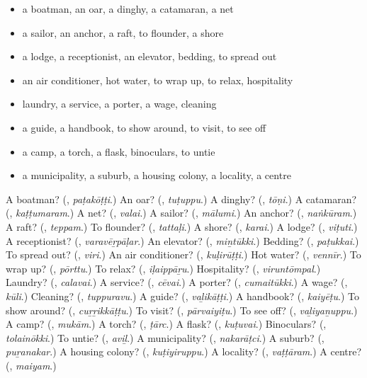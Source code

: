 \begin{itemize}
\raggedright
  \item a boatman, an oar, a dinghy, a catamaran, a net
  \item a sailor, an anchor, a raft, to flounder, a shore
  \item a lodge, a receptionist, an elevator, bedding, to spread out
  \item an air conditioner, hot water, to wrap up, to relax, hospitality
  \item laundry, a service, a porter, a wage, cleaning
  \item a guide, a handbook, to show around, to visit, to see off
  \item a camp, a torch, a flask, binoculars, to untie
  \item a municipality, a suburb, a housing colony, a locality, a centre
\end{itemize}

\begin{tcolorbox}[breakable,colback=teal!4,colframe=teal!35!black,title={Before you move on}]
A boatman? (\textbf{}, \emph{paṭakōṭṭi}.) An oar? (\textbf{}, \emph{tuṭuppu}.) A dinghy? (\textbf{}, \emph{tōṇi}.) A catamaran? (\textbf{}, \emph{kaṭṭumaram}.) A net? (\textbf{}, \emph{valai}.) A sailor? (\textbf{}, \emph{mālumi}.) An anchor? (\textbf{}, \emph{naṅkūram}.) A raft? (\textbf{}, \emph{teppam}.) To flounder? (\textbf{}, \emph{tattaḷi}.) A shore? (\textbf{}, \emph{karai}.) A lodge? (\textbf{}, \emph{viṭuti}.) A receptionist? (\textbf{}, \emph{varavēṟpāḷar}.) An elevator? (\textbf{}, \emph{miṉtūkki}.) Bedding? (\textbf{}, \emph{paṭukkai}.) To spread out? (\textbf{}, \emph{viri}.) An air conditioner? (\textbf{}, \emph{kuḷirūṭṭi}.) Hot water? (\textbf{}, \emph{vennīr}.) To wrap up? (\textbf{}, \emph{pōrttu}.) To relax? (\textbf{}, \emph{iḷaippāṟu}.) Hospitality? (\textbf{}, \emph{viruntōmpal}.) Laundry? (\textbf{}, \emph{calavai}.) A service? (\textbf{}, \emph{cēvai}.) A porter? (\textbf{}, \emph{cumaitūkki}.) A wage? (\textbf{}, \emph{kūli}.) Cleaning? (\textbf{}, \emph{tuppuravu}.) A guide? (\textbf{}, \emph{vaḻikāṭṭi}.) A handbook? (\textbf{}, \emph{kaiyēṭu}.) To show around? (\textbf{}, \emph{cuṟṟikkāṭṭu}.) To visit? (\textbf{}, \emph{pārvaiyiṭu}.) To see off? (\textbf{}, \emph{vaḻiyaṉuppu}.) A camp? (\textbf{}, \emph{mukām}.) A torch? (\textbf{}, \emph{ṭārc}.) A flask? (\textbf{}, \emph{kuṭuvai}.) Binoculars? (\textbf{}, \emph{tolainōkki}.) To untie? (\textbf{}, \emph{aviḻ}.) A municipality? (\textbf{}, \emph{nakarāṭci}.) A suburb? (\textbf{}, \emph{puṟanakar}.) A housing colony? (\textbf{}, \emph{kuṭiyiruppu}.) A locality? (\textbf{}, \emph{vaṭṭāram}.) A centre? (\textbf{}, \emph{maiyam}.)
\end{tcolorbox}
